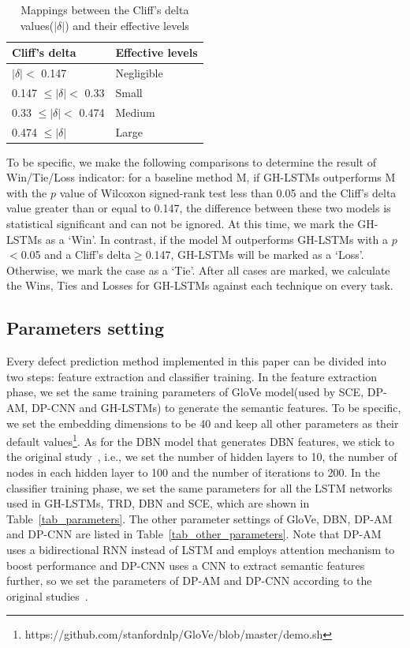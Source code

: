 \documentclass[journal]{IEEEtran}
\begin{document}
\begin{table}[htbp]
	\footnotesize
	\caption{Mappings between the Cliff's delta values($|\delta|$) and their effective levels}
	\label{tab_delta}
	\tabcolsep 30pt
	\centering
	\begin{tabular}{ ll}
		\toprule
		Cliff's delta                  & Effective levels \\\midrule
		$|\delta| <$ 0.147             & Negligible       \\
		0.147 $\leq |\delta| <$ 0.33   & Small            \\
		0.33 $\leq |\delta| <$ 0.474   & Medium           \\
		0.474 $\leq |\delta|$         & Large             \\
		\bottomrule
	\end{tabular}
\end{table}

To be specific, we make the following comparisons to determine the result of Win/Tie/Loss indicator: for a baseline method M, if GH-LSTMs outperforms M with the $p$ value of Wilcoxon signed-rank test less than 0.05 and the Cliff's delta value greater than or equal to 0.147, the difference between these two models is statistical significant and can not be ignored. At this time, we mark the GH-LSTMs as a `Win'. In contrast, if the model M outperforms GH-LSTMs with a $p$ $<$0.05 and a Cliff's delta$\geq$0.147, GH-LSTMs will be marked as a `Loss'. Otherwise, we mark the case as a `Tie'. After all cases are marked, we calculate the Wins, Ties and Losses for GH-LSTMs against each technique on every task.



\subsection{Parameters setting}
Every defect prediction method implemented in this paper can be divided into two steps: feature extraction and classifier training. In the feature extraction phase, we set the same training parameters of GloVe model(used by SCE, DP-AM, DP-CNN and GH-LSTMs) to generate the semantic features. To be specific, we set the embedding dimensions to be 40 and keep all other parameters as their default values\footnote{https://github.com/stanfordnlp/GloVe/blob/master/demo.sh}. As for the DBN model that generates DBN features, we stick to the original study~\cite{wang2018deep}, i.e., we set the number of hidden layers to 10, the number of nodes in each hidden layer to 100 and the number of iterations to 200. In the classifier training phase, we set the same parameters for all the LSTM networks used in GH-LSTMs, TRD, DBN and SCE, which are shown in Table~\ref{tab_parameters}. The other parameter settings of GloVe, DBN, DP-AM and DP-CNN are listed in Table~\ref{tab_other_parameters}. Note that DP-AM uses a bidirectional RNN instead of LSTM and employs attention mechanism to boost performance and DP-CNN uses a CNN to extract semantic features further, so we set the parameters of DP-AM and DP-CNN according to the original studies~\cite{fan2019deep, jian2017dpcnn}.
\end{document}
